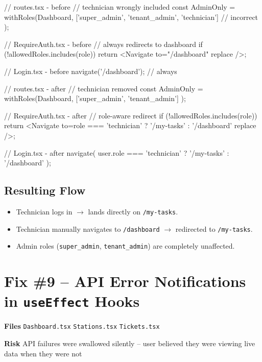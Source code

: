 \documentclass[12pt,a4paper]{report}
\newcommand{\diffL}{\noindent\begin{minipage}[t]{0.485\linewidth}}
\newcommand{\diffR}{\end{minipage}\hfill\begin{minipage}[t]{0.485\linewidth}}
\newcommand{\diffend}{\end{minipage}\par\smallskip}
\newcommand{\inforow}[2]{%
	\noindent
	\begin{tcolorbox}[
		colback   = lightblue,
		colframe  = midblue,
		arc       = 2pt,
		left      = 6pt, right = 6pt, top = 2pt, bottom = 2pt,
		sidebyside, sidebyside align = top seam,
		lefthand width = 3.2cm,
		segmentation hidden,
		]
		\textbf{\color{brandblue}\small #1}
		\tcblower
		{\small\color{labelgray} #2}
	\end{tcolorbox}\vspace{2pt}%
}
\newcommand{\file}[1]{\texttt{\small #1}}
\begin{document}
	\diffL
	\begin{beforecode}
		// routes.tsx - before
		// technician wrongly included
		const AdminOnly = withRoles(Dashboard,
		['super_admin',
		'tenant_admin',
		'technician']  // incorrect
		);
		
		// RequireAuth.tsx - before
		// always redirects to dashboard
		if (!allowedRoles.includes(role)) {
			return <Navigate
			to="/dashboard" replace />;
		}
		
		// Login.tsx - before
		navigate('/dashboard'); // always
	\end{beforecode}
	\diffR
	\begin{aftercode}
		// routes.tsx - after
		// technician removed
		const AdminOnly = withRoles(Dashboard,
		['super_admin', 'tenant_admin']
		);
		
		// RequireAuth.tsx - after
		// role-aware redirect
		if (!allowedRoles.includes(role)) {
			return <Navigate
			to={role === 'technician'
				? '/my-tasks'
				: '/dashboard'}
			replace />;
		}
		
		// Login.tsx - after
		navigate(
		user.role === 'technician'
		? '/my-tasks'
		: '/dashboard'
		);
	\end{aftercode}
	\diffend
	
	\subsection*{Resulting Flow}
	\begin{itemize}
		\item Technician logs in $\to$ lands directly on \texttt{/my-tasks}.
		\item Technician manually navigates to \texttt{/dashboard} $\to$ redirected to \texttt{/my-tasks}.
		\item Admin roles (\texttt{super\_admin}, \texttt{tenant\_admin}) are completely unaffected.
	\end{itemize}
	
	\section{Fix \#9 -- API Error Notifications in \texttt{useEffect} Hooks}
	
	\inforow{Files}{\file{Dashboard.tsx} \quad \file{Stations.tsx} \quad \file{Tickets.tsx}}
	\inforow{Risk}{API failures were swallowed silently -- user believed they were viewing live data when they were not}
	
\end{document}

